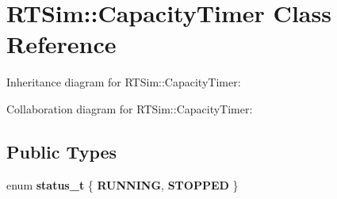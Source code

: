 \hypertarget{classRTSim_1_1CapacityTimer}{}\section{R\+T\+Sim\+:\+:Capacity\+Timer Class Reference}
\label{classRTSim_1_1CapacityTimer}


Inheritance diagram for R\+T\+Sim\+:\+:Capacity\+Timer\+:


Collaboration diagram for R\+T\+Sim\+:\+:Capacity\+Timer\+:
\subsection*{Public Types}
\begin{DoxyCompactItemize}
\item 
enum {\bfseries status\+\_\+t} \{ {\bfseries R\+U\+N\+N\+I\+NG}, 
{\bfseries S\+T\+O\+P\+P\+ED}
 \}\hypertarget{classRTSim_1_1CapacityTimer_a0dbd9bf1135bf909781dea74134e3554}{}\label{classRTSim_1_1CapacityTimer_a0dbd9bf1135bf909781dea74134e3554}

\end{DoxyCompactItemize}
